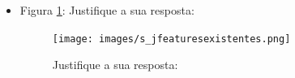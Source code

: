 \begin{itemize}
    \item Figura \ref{figure:s_jfeaturesexistentes}: Justifique a sua resposta:
    \begin{figure}[!htb]
    \centering
    \texttt{[image: images/s\_jfeaturesexistentes.png]}
    \label{figure:s_jfeaturesexistentes}
    \caption{Justifique a sua resposta:}
    \end{figure}   
    
    
\end{itemize}
















